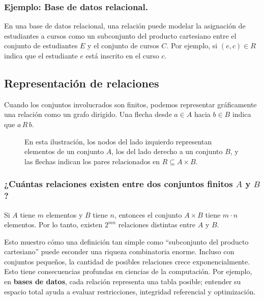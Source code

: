 \subsubsection*{Ejemplo: Base de datos relacional.} 
En una base de datos relacional, una relación puede modelar la asignación de estudiantes a cursos como un subconjunto del producto cartesiano entre el conjunto de estudiantes $E$ y el conjunto de cursos $C$. Por ejemplo, si $(e, c) \in R$ indica que el estudiante $e$ está inscrito en el curso $c$.


\subsection{Representación de relaciones}
Cuando los conjuntos involucrados son finitos, podemos representar gráficamente una relación como un grafo dirigido. Una flecha desde $a \in A$ hacia $b \in B$ indica que $a \, R \, b$.


\begin{figure}[h]
\centering
{}
\caption{En esta ilustración, los nodos del lado izquierdo representan elementos de un conjunto $A$, los del lado derecho a un conjunto $B$, y las flechas indican los pares relacionados en $R \subseteq A \times B$.}
\end{figure}



\subsubsection*{¿Cuántas relaciones existen entre dos conjuntos finitos $A$ y $B$? }
Si $A$ tiene $m$ elementos y $B$ tiene $n$, entonces el conjunto $A \times B$ tiene $m \cdot n$ elementos. Por lo tanto, existen $2^{mn}$ relaciones distintas entre $A$ y $B$.

Esto muestro cómo una definición tan simple como ``subconjunto del producto cartesiano'' puede esconder una riqueza combinatoria enorme. Incluso con conjuntos pequeños, la cantidad de posibles relaciones crece exponencialmente. Esto tiene consecuencias profundas en ciencias de la computación. Por ejemplo,  en \textbf{bases de datos}, cada relación representa una tabla posible; entender su espacio total ayuda a evaluar restricciones, integridad referencial y optimización.
  



